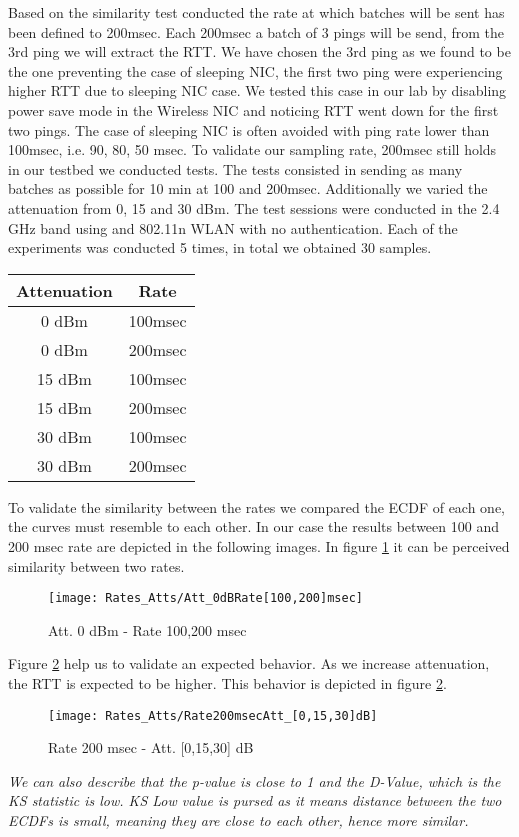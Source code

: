 Based on the similarity test conducted the rate at which batches will be sent has been defined to 200msec. Each 200msec a batch of 3 pings will be send, from the 3rd ping we will extract the RTT. We have chosen the 3rd ping as we found to be the one preventing the case of sleeping NIC, the first two ping were experiencing higher RTT due to sleeping NIC case. We tested this case in our lab by disabling power save mode in the Wireless NIC and noticing RTT went down for the first two pings. The case of sleeping NIC is often avoided with ping rate lower than 100msec, i.e. 90, 80, 50 msec. To validate our sampling rate, 200msec still holds in our testbed we conducted tests. The tests consisted in sending as many batches as possible for 10 min at 100 and 200msec. Additionally we varied the attenuation from 0, 15 and 30 dBm. The test sessions were conducted in the 2.4 GHz band using and 802.11n WLAN with no authentication. Each of the experiments was conducted 5 times, in total we obtained 30 samples.

\begin{center}
	\begin{tabular}{||c c||}
		\hline
		Attenuation & Rate\\ [0.5ex] 
		\hline\hline
		0 dBm & 100msec\\ 
		\hline
		0 dBm & 200msec\\
		\hline
		15 dBm & 100msec\\
		\hline
		15 dBm & 200msec\\
		\hline
		30 dBm & 100msec\\
		\hline
		30 dBm & 200msec\\ [1ex] 
		\hline
	\end{tabular}
\end{center}

To validate the similarity between the rates we compared the ECDF of each one, the curves must resemble to each other. In our case the results between 100 and 200 msec rate are depicted in the following images. In figure \ref{att_0_100and200msec} it can be perceived similarity between two rates.

\begin{figure}[h]
	\centering
	\texttt{[image: Rates\_Atts/Att\_0dBRate[100,200]msec]}
	\caption{Att. 0 dBm - Rate 100,200 msec}
	\label{att_0_100and200msec}
\end{figure}

Figure \ref{rate_200msec_Att_0_15_30dBm} help us to validate an expected behavior. As we increase attenuation, the RTT is expected to be higher. This behavior is depicted in figure \ref{rate_200msec_Att_0_15_30dBm}.

\begin{figure}[h]
	\centering
	\texttt{[image: Rates\_Atts/Rate200msecAtt\_[0,15,30]dB]}
	\caption{Rate 200 msec - Att. [0,15,30] dB}
	\label{rate_200msec_Att_0_15_30dBm}
\end{figure}

\emph{We can also describe that the p-value is close to 1 and the D-Value, which is the KS statistic is low. KS Low value is pursed as it means distance between the two ECDFs is small, meaning they are close to each other, hence more similar.}